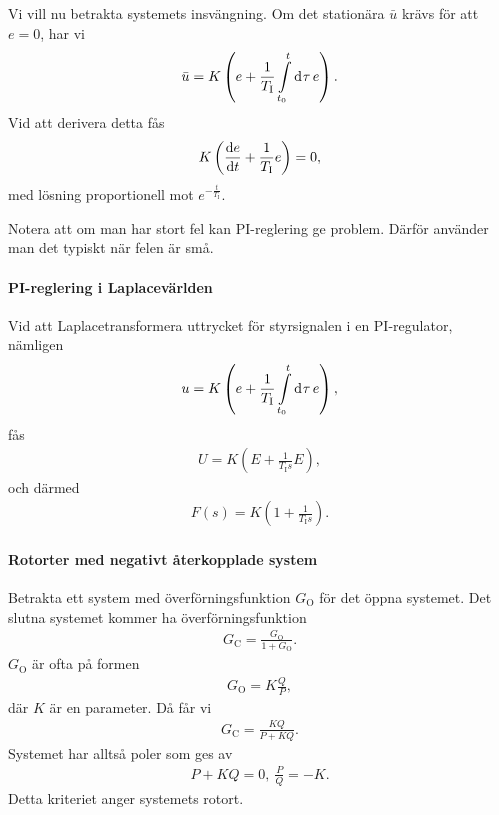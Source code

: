 Vi vill nu betrakta systemets insvängning. Om det stationära $\bar{u}$ krävs för att $e = 0$, har vi
\begin{align*}
	\bar{u} = K\left(e + \frac{1}{T_{\text{I}}}\int\limits_{t_{0}}^{t}\dd[]{\tau}e\right).
\end{align*}
Vid att derivera detta fås
\begin{align*}
	K\left(\dv{e}{t} + \frac{1}{T_{\text{I}}}e\right) = 0,
\end{align*}
med lösning proportionell mot $e^{-\frac{t}{T_{\text{I}}}}$.

Notera att om man har stort fel kan PI-reglering ge problem. Därför använder man det typiskt när felen är små.

\paragraph{PI-reglering i Laplacevärlden}
Vid att Laplacetransformera uttrycket för styrsignalen i en PI-regulator, nämligen
\begin{align*}
	u = K\left(e + \frac{1}{T_{\text{I}}}\int\limits_{t_{0}}^{t}\dd[]{\tau}e\right),
\end{align*}
fås
\begin{align*}
	U = K\left(E + \frac{1}{T_{\text{I}}s}E\right),
\end{align*}
och därmed
\begin{align*}
	F(s) = K\left(1 + \frac{1}{T_{\text{I}}s}\right).
\end{align*}

\paragraph{Rotorter med negativt återkopplade system}
Betrakta ett system med överförningsfunktion $G_{\text{O}}$ för det öppna systemet. Det slutna systemet kommer ha överförningsfunktion
\begin{align*}
	G_{\text{C}} = \frac{G_{\text{O}}}{1 + G_{\text{O}}}.
\end{align*}
$G_{\text{O}}$ är ofta på formen
\begin{align*}
	G_{\text{O}} = K\frac{Q}{P},
\end{align*}
där $K$ är en parameter. Då får vi
\begin{align*}
	G_{\text{C}} = \frac{KQ}{P + KQ}.
\end{align*}
Systemet har alltså poler som ges av
\begin{align*}
	P + KQ = 0,\ \frac{P}{Q} = -K.
\end{align*}
Detta kriteriet anger systemets rotort.


